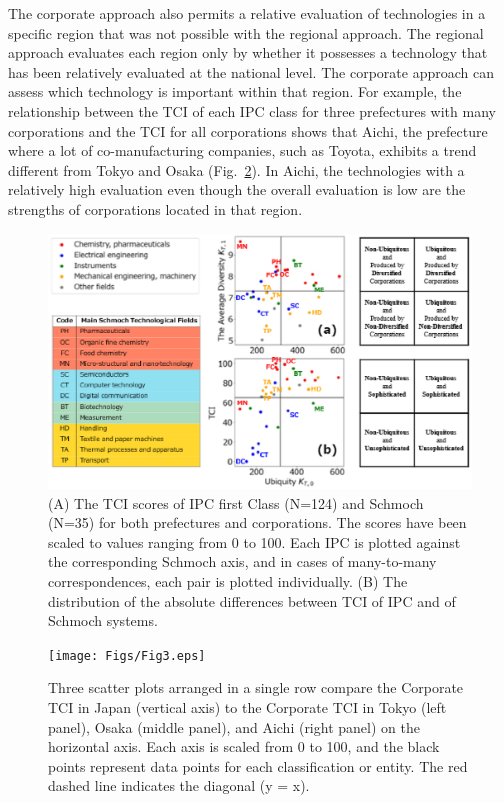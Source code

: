 \documentclass[fleqn,10pt]{wlscirep}
\begin{document}
The corporate approach also permits a relative evaluation of technologies in a specific region that was not possible with the regional approach. The regional approach evaluates each region only by whether it possesses a technology that has been relatively evaluated at the national level. The corporate approach can assess which technology is important within that region. For example, the relationship between the TCI of each IPC class for three prefectures with many corporations and the TCI for all corporations shows that Aichi, the prefecture where a lot of co-manufacturing companies, such as Toyota, exhibits a trend different from Tokyo and Osaka (Fig.~\ref{fig:prefcompare}). In Aichi, the technologies with a relatively high evaluation even though the overall evaluation is low are the strengths of corporations located in that region.


\begin{figure}[ht]
    \centering
    \includegraphics[scale=0.65]{Figs/Fig2.eps}
    \caption{(A) The TCI scores of IPC first Class (N=124) and Schmoch (N=35) for both prefectures and corporations. The scores have been scaled to values ranging from 0 to 100. Each IPC is plotted against the corresponding Schmoch axis, and in cases of many-to-many correspondences, each pair is plotted individually. (B) The distribution of the absolute differences between TCI of IPC and of Schmoch systems.}
    \label{fig:detailtci}
\end{figure}


\begin{figure}[ht]
    \centering
    \texttt{[image: Figs/Fig3.eps]}
    \caption{Three scatter plots arranged in a single row compare the Corporate TCI in Japan (vertical axis) to the Corporate TCI in Tokyo (left panel), Osaka (middle panel), and Aichi (right panel) on the horizontal axis. Each axis is scaled from 0 to 100, and the black points represent data points for each classification or entity. The red dashed line indicates the diagonal (y = x).}
    \label{fig:prefcompare}
\end{figure}
\end{document}
